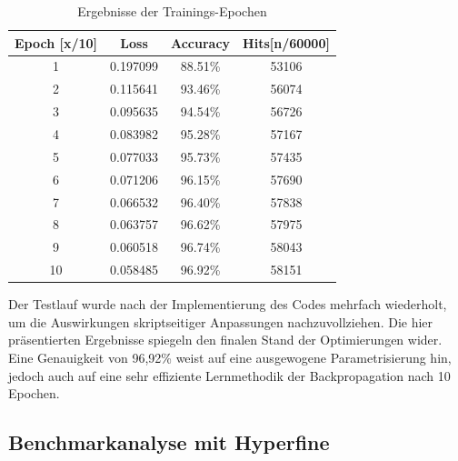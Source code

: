 \documentclass[a4paper, 12pt]{article}
\begin{document}
\begin{table}[h!]
	\centering
	\begin{tabular}{@{}cccc@{}}
	\toprule
	\textbf{Epoch [x/10]} & \textbf{Loss} & \textbf{Accuracy} & \textbf{Hits[n/60000]} \\ \midrule
	1            & 0.197099      & 88.51\%           & 53106                                    \\
	2            & 0.115641      & 93.46\%           & 56074                                    \\
	3            & 0.095635      & 94.54\%           & 56726                                    \\
	4            & 0.083982      & 95.28\%           & 57167                                    \\
	5            & 0.077033      & 95.73\%           & 57435                                    \\
	6            & 0.071206      & 96.15\%           & 57690                                    \\
	7            & 0.066532      & 96.40\%           & 57838                                    \\
	8            & 0.063757      & 96.62\%           & 57975                                    \\
	9            & 0.060518      & 96.74\%           & 58043                                    \\
	10           & 0.058485      & 96.92\%           & 58151                                    \\ \bottomrule
	\end{tabular}
	\caption{Ergebnisse der Trainings-Epochen}
	\label{tab:testresults}
\end{table}

Der Testlauf wurde nach der Implementierung des Codes mehrfach wiederholt, um die Auswirkungen 
skriptseitiger Anpassungen nachzuvollziehen. Die hier präsentierten Ergebnisse spiegeln 
den finalen Stand der Optimierungen wider. Eine Genauigkeit von 96,92\% weist auf eine ausgewogene 
Parametrisierung hin, jedoch auch auf eine sehr effiziente Lernmethodik der Backpropagation
nach 10 Epochen.

\subsection{Benchmarkanalyse mit Hyperfine}\label{chapter..4.2}
\end{document}
